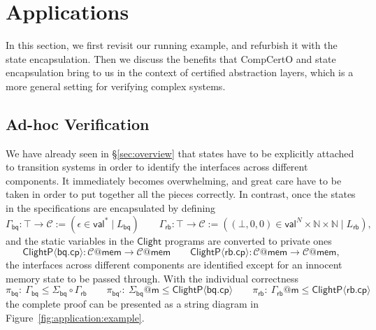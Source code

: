 \documentclass[acmsmall,screen,review,anonymous]{acmart}
\newcommand{\kw}[1]{\ensuremath{ \mathsf{#1} }}
\begin{document}

\section{Applications} %

In this section, we first revisit our running example,
and refurbish it with the state encapsulation.
Then we discuss the
benefits that CompCertO and state encapsulation
bring to us in the context of
certified abstraction layers,
which is a more general setting for verifying complex systems.

\subsection{Ad-hoc Verification}

We have already seen in \S\ref{sec:overview}
that states have to be explicitly attached to transition systems
in order to identify the interfaces across different components.
It immediately becomes overwhelming,
and great care have to be taken
in order to put together all the pieces correctly.
In contrast,
once the states in the specifications
are encapsulated by defining
\[
  \Gamma_\kw{bq}: \top \rightarrow \mathcal{C} := (\epsilon \in \kw{val}^* \mid L_\kw{bq}) \qquad
  \Gamma_\kw{rb}: \top \rightarrow \mathcal{C} := ((\bot, 0, 0) \in \kw{val}^N \times \mathbb{N} \times \mathbb{N} \mid L_\kw{rb}),
\]
and the static variables in the $\kw{Clight}$ programs are
converted to private ones
\[
  \kw{ClightP} \langle \kw{bq.cp} \rangle : \mathcal{C} @ \kw{mem} \rightarrow \mathcal{C} @ \kw{mem} \qquad
  \kw{ClightP} \langle \kw{rb.cp} \rangle : \mathcal{C} @ \kw{mem} \rightarrow \mathcal{C} @ \kw{mem},
\]
the interfaces across different components are identified
except for an innocent memory state to be passed through.
With the individual correctness
\[
  \pi_\kw{bq}:\ \Gamma_\kw{bq} \le \Sigma_\kw{bq} \circ \Gamma_\kw{rb} \qquad
  \pi_\kw{bq'}:\ \Sigma_\kw{bq} @ \kw{m} \le \kw{ClightP}\langle \kw{bq.cp} \rangle \qquad
  \pi_\kw{rb}:\ \Gamma_\kw{rb} @ \kw{m} \le \kw{ClightP} \langle \kw{rb.cp} \rangle
\]
the complete proof can be presented
as a string diagram in Figure~\ref{fig:application:example}.
\end{document}
